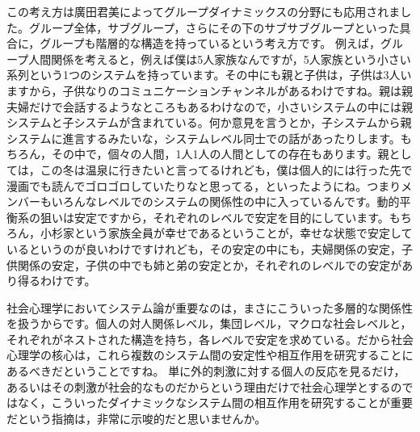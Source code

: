 \documentclass{ltjsbook}
\begin{document}
この考え方は廣田君美によってグループダイナミックスの分野にも応用されました\parencite{HirotaKimiyoshi}。グループ全体，サブグループ，さらにその下のサブサブグループといった具合に，グループも階層的な構造を持っているという考え方です。
例えば，グループ人間関係を考えると，例えば僕は5人家族なんですが，5人家族という小さい系列という1つのシステムを持っています。その中にも親と子供は，子供は3人いますから，子供なりのコミュニケーションチャンネルがあるわけですね。親は親夫婦だけで会話するようなところもあるわけなので，小さいシステムの中には親システムと子システムが含まれている。何か意見を言うとか，子システムから親システムに進言するみたいな，システムレベル同士での話があったりします。もちろん，その中で，個々の人間，1人1人の人間としての存在もあります。親としては，この冬は温泉に行きたいと言ってるけれども，僕は個人的には行った先で漫画でも読んでゴロゴロしていたりなと思ってる，といったようにね。つまりメンバーもいろんなレベルでのシステムの関係性の中に入っているんです。動的平衡系の狙いは安定ですから，それぞれのレベルで安定を目的にしています。もちろん，小杉家という家族全員が幸せであるということが，幸せな状態で安定しているというのが良いわけですけれども，その安定の中にも，夫婦関係の安定，子供関係の安定，子供の中でも姉と弟の安定とか，それぞれのレベルでの安定があり得るわけです。

社会心理学においてシステム論が重要なのは，まさにこういった多層的な関係性を扱うからです。個人の対人関係レベル，集団レベル，マクロな社会レベルと，それぞれがネストされた構造を持ち，各レベルで安定を求めている。だから社会心理学の核心は，これら複数のシステム間の安定性や相互作用を研究することにあるべきだということですね。
単に外的刺激に対する個人の反応を見るだけ，あるいはその刺激が社会的なものだからという理由だけで社会心理学とするのではなく，こういったダイナミックなシステム間の相互作用を研究することが重要だという指摘は，非常に示唆的だと思いませんか。
\end{document}
